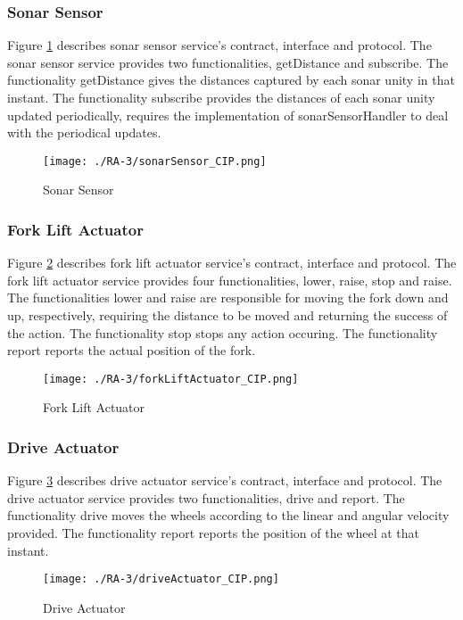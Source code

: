 \subsubsection{Sonar Sensor} %
Figure \ref{fig:sonarsensor_cip} describes sonar sensor service's contract, interface and protocol. The sonar sensor service provides two functionalities, getDistance and subscribe. The functionality getDistance gives the distances captured by each sonar unity in that instant. The functionality subscribe provides the distances of each sonar unity updated periodically, requires the implementation of sonarSensorHandler to deal with the periodical updates.
\begin{figure}[ht!]
 \centering
 \texttt{[image: ./RA-3/sonarSensor\_CIP.png]}
 \caption{Sonar Sensor}
 \label{fig:sonarsensor_cip}
\end{figure}

\subsubsection{Fork Lift Actuator} %
Figure \ref{fig:forkliftactuator_cip} describes fork lift actuator service's contract, interface and protocol. The fork lift actuator service provides four functionalities, lower, raise, stop and raise. The functionalities lower and raise are responsible for moving the fork down and up, respectively, requiring the distance to be moved and returning the success of the action. The functionality stop stops any action occuring. The functionality report reports the actual position of the fork.
\begin{figure}[ht!]
 \centering
 \texttt{[image: ./RA-3/forkLiftActuator\_CIP.png]}
 \caption{Fork Lift Actuator}
 \label{fig:forkliftactuator_cip}
\end{figure}

\subsubsection{Drive Actuator} %
Figure \ref{fig:driveactuator_cip} describes drive actuator service's contract, interface and protocol. The drive actuator service provides two functionalities, drive and report. The functionality drive moves the wheels according to the linear and angular velocity provided. The functionality report reports the position of the wheel at that instant.
\begin{figure}[ht!]
 \centering
 \texttt{[image: ./RA-3/driveActuator\_CIP.png]}
 \caption{Drive Actuator}
 \label{fig:driveactuator_cip}
\end{figure}

